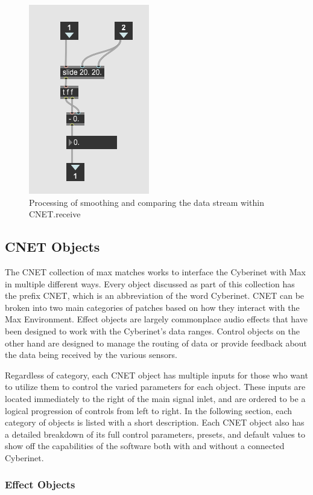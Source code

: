 \begin{figure}
    \centering
    \includegraphics[scale=1.3]{diagrams/maxPatches/smoothr.png}
    \caption{Processing of smoothing and comparing the data stream within CNET.receive}
    \label{fig:smoothr}
\end{figure}

\subsection{CNET Objects}
The CNET collection of max matches works to interface the Cyberinet with Max in multiple different ways. Every object discussed as part of this collection has the prefix CNET, which is an abbreviation of the word Cyberinet. CNET can be broken into two main categories of patches based on how they interact with the Max Environment. Effect objects are largely commonplace audio effects that have been designed to work with the Cyberinet's data ranges. Control objects on the other hand are designed to manage the routing of data or provide feedback about the data being received by the various sensors.


Regardless of category, each CNET object has multiple inputs for those who want to utilize them to control the varied parameters for each object. These inputs are located immediately to the right of the main signal inlet, and are ordered to be a logical progression of controls from left to right. In the following section, each category of objects is listed with a short description. Each CNET object also has a detailed breakdown of its full control parameters, presets, and default values to show off the capabilities of the software both with and without a connected Cyberinet.

\subsubsection{Effect Objects}

